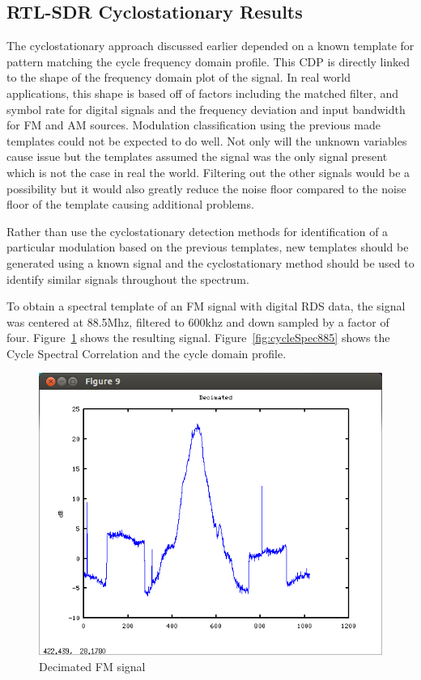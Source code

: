 \subsection{RTL-SDR Cyclostationary Results}

The cyclostationary approach discussed earlier depended
on a known template for pattern matching the cycle frequency domain profile. 
This CDP is directly linked to the shape of the frequency domain plot of the
signal.  In real world applications, this shape is based off of factors
including the matched filter, and symbol rate for digital signals and the
frequency deviation and input bandwidth for FM and AM sources.
Modulation classification using the previous made templates could not be
expected to do well.  Not only will the unknown variables cause issue but the templates
assumed the signal was the only signal present which is not the case in real the
world.  Filtering out the other signals would be a possibility but it would also
greatly reduce the noise floor compared to the noise floor of the template
causing additional problems.

Rather than use the cyclostationary detection methods for identification of a
particular modulation based on the previous templates, new templates should be
generated using a known signal and the cyclostationary method should be used to
identify similar signals throughout the spectrum.  

To obtain a spectral template of an FM signal with digital RDS data, the signal
was centered at 88.5Mhz, filtered to 600khz and down sampled by a factor of four.
Figure~\ref{fig:decimatedFMandDig} shows the resulting signal. 
Figure~\ref{fig:cycleSpec885} shows the Cycle Spectral Correlation and the cycle
domain profile.

\begin{figure}
\centering
\includegraphics[width=\linewidth]{../img/Report_Decimated_FM_and_Digital.png}
\caption{Decimated FM signal}
\label{fig:decimatedFMandDig}

\end{figure}


